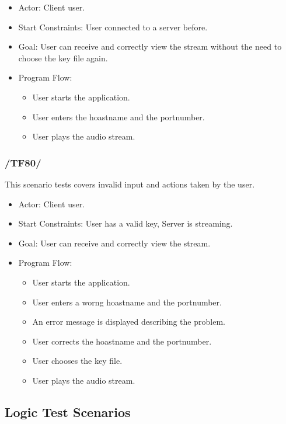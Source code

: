 \documentclass[a4paper,10pt]{scrartcl}
\begin{document}
\begin{itemize}
	\item Actor: Client user.
	\item Start Constraints: User connected to a server before.
	\item Goal: User can receive and correctly view the stream without the need to choose the key file again.
	\item Program Flow:
	\begin{itemize}
   \item User starts the application.
   \item User enters the hoastname and the portnumber.
   \item User plays the audio stream.
\end{itemize}
\end{itemize}

\subsubsection{/TF80/}
This scenario tests covers invalid input and actions taken by the user.

\begin{itemize}
	\item Actor: Client user.
	\item Start Constraints: User has a valid key, Server is streaming.
	\item Goal: User can receive and correctly view the stream.
	\item Program Flow:
	\begin{itemize}
   \item User starts the application.
   \item User enters a worng hoastname and the portnumber.
   \item An error message is displayed describing the problem.
 	 \item User corrects the hoastname and the portnumber.
	 \item User chooses the key file.
   \item User plays the audio stream.
\end{itemize}
\end{itemize}

\subsection{Logic Test Scenarios}
\end{document}

